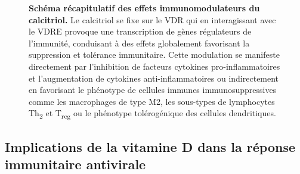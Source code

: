 \documentclass[
  a4paper,
  DIV=11,
  numbers=noendperiod,
  listof=totoc]{scrreprt}
\begin{document}
\begin{figure}


\caption[Schéma récapitulatif des effets immunomodulateurs du
calcitriol.]{\label{fig-immunomod}\textbf{Schéma récapitulatif des
effets immunomodulateurs du calcitriol.} Le calcitriol se fixe sur le
VDR qui en interagissant avec le VDRE provoque une transcription de
gènes régulateurs de l'immunité, conduisant à des effets globalement
favorisant la suppression et tolérance immunitaire. Cette modulation se
manifeste directement par l'inhibition de facteurs cytokines
pro-inflammatoires et l'augmentation de cytokines anti-inflammatoires ou
indirectement en favorisant le phénotype de cellules immunes
immunosuppressives comme les macrophages de type M2, les sous-types de
lymphocytes Th\textsubscript{2} et T\textsubscript{reg} ou le phénotype
tolérogénique des cellules dendritiques. \textcite{Meza-Meza.2022}}

\end{figure}%

\subsection{Implications de la vitamine D dans la réponse immunitaire
antivirale}\label{implications-de-la-vitamine-d-dans-la-ruxe9ponse-immunitaire-antivirale}
\end{document}
